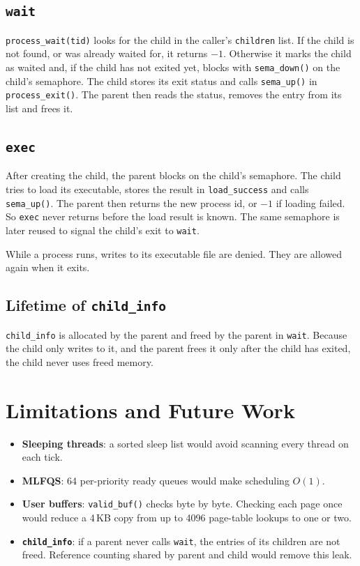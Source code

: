 \documentclass[a4paper,11pt]{article}
\newcommand{\code}[1]{\texttt{#1}}
\begin{document}
\subsection*{\code{wait}}
\code{process\_wait(tid)} looks for the child in the caller's \code{children} list. If the child is not found, or was already waited for, it returns $-1$. Otherwise it marks the child as waited and, if the child has not exited yet, blocks with \code{sema\_down()} on the child's semaphore. The child stores its exit status and calls \code{sema\_up()} in \code{process\_exit()}. The parent then reads the status, removes the entry from its list and frees it.

\subsection*{\code{exec}}
After creating the child, the parent blocks on the child's semaphore. The child tries to load its executable, stores the result in \code{load\_success} and calls \code{sema\_up()}. The parent then returns the new process id, or $-1$ if loading failed. So \code{exec} never returns before the load result is known. The same semaphore is later reused to signal the child's exit to \code{wait}.

While a process runs, writes to its executable file are denied. They are allowed again when it exits.

\subsection*{Lifetime of \code{child\_info}}
\code{child\_info} is allocated by the parent and freed by the parent in \code{wait}. Because the child only writes to it, and the parent frees it only after the child has exited, the child never uses freed memory.

\section{Limitations and Future Work}
\begin{itemize}
  \item \textbf{Sleeping threads}: a sorted sleep list would avoid scanning every thread on each tick.
  \item \textbf{MLFQS}: 64 per-priority ready queues would make scheduling $O(1)$.
  \item \textbf{User buffers}: \code{valid\_buf()} checks byte by byte. Checking each page once would reduce a 4\,KB copy from up to 4096 page-table lookups to one or two.
  \item \textbf{\code{child\_info}}: if a parent never calls \code{wait}, the entries of its children are not freed. Reference counting shared by parent and child would remove this leak.
\end{itemize}
\end{document}

